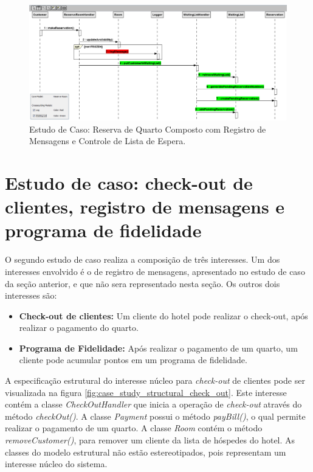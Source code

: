 \begin{landscape}
  \begin{figure}[tb]
	\centering
	\includegraphics[scale=0.7]{img/case_study_compound_2.png}
	\caption{Estudo de Caso: Reserva de Quarto Composto com Registro de Mensagens e Controle de Lista de Espera.}\label{fig:case_study_compound_2}
  \end{figure}
\end{landscape}
  
\section{Estudo de caso: check-out de clientes, registro de mensagens e programa de fidelidade}

O segundo estudo de caso realiza a composição de três interesses. Um dos interesses envolvido é o de registro de mensagens, apresentado no estudo de
caso da seção anterior, e que não sera representado nesta seção. Os outros dois interesses são:

\begin{itemize}
  \item \textbf{Check-out de clientes:} Um cliente do hotel pode realizar o check-out, após realizar o pagamento do quarto.
  \item \textbf{Programa de Fidelidade:} Após realizar o pagamento de um quarto, um cliente pode acumular pontos em um programa de fidelidade.
\end{itemize}

A especificação estrutural do interesse núcleo para \textit{check-out} de clientes pode ser visualizada na figura
\ref{fig:case_study_structural_check_out}. Este interesse contém a classe \textit{CheckOutHandler} que inicia a operação de \textit{check-out} através 
do método \textit{checkOut()}. A classe \textit{Payment} possui o método \textit{payBill()}, o qual permite realizar o pagamento de um quarto. A
classe \textit{Room} contém o método \textit{removeCustomer()}, para remover um cliente da lista de hóspedes do hotel. As classes do modelo estrutural
não estão estereotipados, pois representam um interesse núcleo do sistema.

